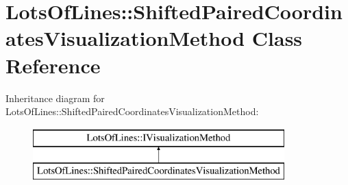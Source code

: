 \hypertarget{class_lots_of_lines_1_1_shifted_paired_coordinates_visualization_method}{}\section{Lots\+Of\+Lines\+:\+:Shifted\+Paired\+Coordinates\+Visualization\+Method Class Reference}
\label{class_lots_of_lines_1_1_shifted_paired_coordinates_visualization_method}
Inheritance diagram for Lots\+Of\+Lines\+:\+:Shifted\+Paired\+Coordinates\+Visualization\+Method\+:\begin{figure}[H]
\begin{center}
\leavevmode
\includegraphics[height=2.000000cm]{class_lots_of_lines_1_1_shifted_paired_coordinates_visualization_method}
\end{center}
\end{figure}
